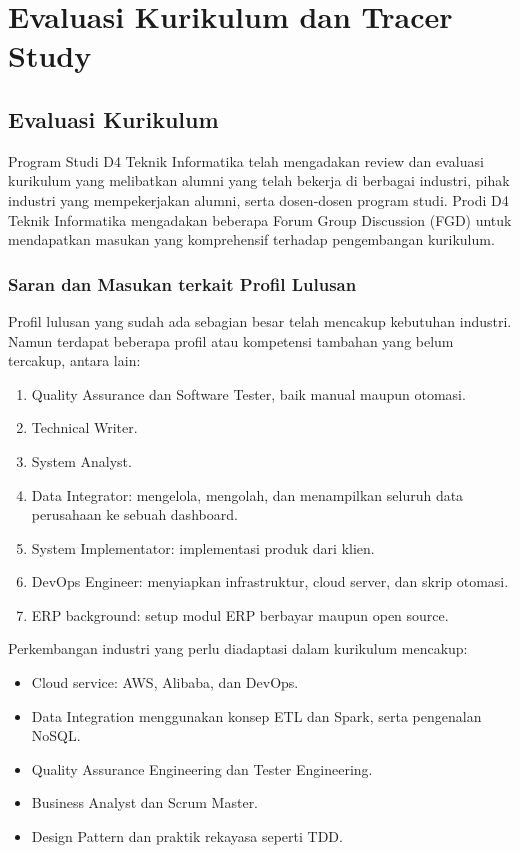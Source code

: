 \chapter{Evaluasi Kurikulum dan Tracer Study}

\renewcommand{\arraystretch}{1.3}

\section{Evaluasi Kurikulum}

Program Studi D4 Teknik Informatika telah mengadakan review dan evaluasi kurikulum yang melibatkan alumni yang telah bekerja di berbagai industri, pihak industri yang mempekerjakan alumni, serta dosen-dosen program studi. Prodi D4 Teknik Informatika mengadakan beberapa Forum Group Discussion (FGD) untuk mendapatkan masukan yang komprehensif terhadap pengembangan kurikulum.

\subsection{Saran dan Masukan terkait Profil Lulusan}

Profil lulusan yang sudah ada sebagian besar telah mencakup kebutuhan industri. Namun terdapat beberapa profil atau kompetensi tambahan yang belum tercakup, antara lain:

\begin{enumerate}
\item Quality Assurance dan Software Tester, baik manual maupun otomasi.
\item Technical Writer.
\item System Analyst.
\item Data Integrator: mengelola, mengolah, dan menampilkan seluruh data perusahaan ke sebuah dashboard.
\item System Implementator: implementasi produk dari klien.
\item DevOps Engineer: menyiapkan infrastruktur, cloud server, dan skrip otomasi.
\item ERP background: setup modul ERP berbayar maupun open source.
\end{enumerate}

Perkembangan industri yang perlu diadaptasi dalam kurikulum mencakup:
\begin{itemize}
\item Cloud service: AWS, Alibaba, dan DevOps.
\item Data Integration menggunakan konsep ETL dan Spark, serta pengenalan NoSQL.
\item Quality Assurance Engineering dan Tester Engineering.
\item Business Analyst dan Scrum Master.
\item Design Pattern dan praktik rekayasa seperti TDD.
\end{itemize}

